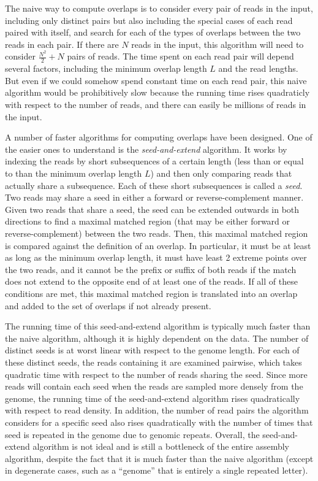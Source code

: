 \documentclass[12pt]{article}
\newcommand{\KeyTerm}[1]{{\it #1}}
\begin{document}
The naive way to compute overlaps is to consider every pair of reads in the
input, including only distinct pairs but also including the special cases of
each read paired with itself, and search for each of the types of overlaps
between the two reads in each pair.  If there are $N$ reads in the input, this
algorithm will need to consider $\frac{N^2}{2} + N$ pairs of reads. The time
spent on each read pair will depend several factors, including the minimum
overlap length $L$ and the read lengths.  But even if we could somehow spend
constant time on each read pair, this naive algorithm would be prohibitively
slow because the running time rises quadraticly with respect to the number of
reads, and there can easily be millions of reads in the input.

A number of faster algorithms for computing overlaps have been designed.  One of
the easier ones to understand is the \KeyTerm{seed-and-extend} algorithm.  It
works by indexing the reads by short subsequences of a certain length (less than
or equal to than the minimum overlap length $L$) and then only comparing reads
that actually share a subsequence.  Each of these short subsequences is called a
\KeyTerm{seed}.  Two reads may share a seed in either a forward or
reverse-complement manner.  Given two reads that share a seed, the seed can be
extended outwards in both directions to find a maximal matched region (that may
be either forward or reverse-complement) between the two reads.  Then, this
maximal matched region is compared against the definition of an overlap.  In
particular, it must be at least as long as the minimum overlap length, it must
have least 2 extreme points over the two reads, and it cannot be the prefix or
suffix of both reads if the match does not extend to the opposite end of at
least one of the reads.  If all of these conditions are met, this maximal matched
region is translated into an overlap and added to the set of overlaps if not
already present.

The running time of this seed-and-extend algorithm is
typically much faster than the naive algorithm, although it is highly dependent
on the data.  The number of distinct seeds is at worst linear with respect to
the genome length.
For each of these distinct seeds, the reads containing it are examined pairwise,
which takes quadratic time with respect to the number of reads sharing the
seed.  Since more reads will contain each seed when the reads are sampled more
densely from the genome, the running time of the seed-and-extend algorithm rises
quadratically with respect to read density.  In addition, the number of read
pairs the algorithm considers for a specific seed also rises quadratically with
the number of times that seed is repeated in the genome due to genomic repeats.
Overall, the seed-and-extend algorithm is not ideal and is still a bottleneck of
the entire assembly algorithm, despite the fact that it is much faster than the
naive algorithm (except in degenerate cases, such as a ``genome'' that is
entirely a single repeated letter).
\end{document}
